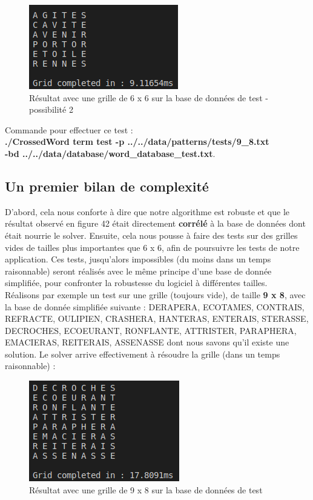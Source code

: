 \documentclass [ 11 pt ] {article}
\begin{document}
        \begin{figure}[H] 
            \center 
            \includegraphics[width=0.3\linewidth]{grid_2.png}
            \caption{Résultat avec une grille de 6 x 6 sur la base de données de test - possibilité 2}
        \end{figure}
        
        Commande pour effectuer ce test : \\
        \textbf{./CrossedWord term test -p ../../data/patterns/tests/9\_8.txt \\ -bd ../../data/database/word\_database\_test.txt}.
        
        \subsection{Un premier bilan de complexité}
        
        D'abord, cela nous conforte à dire que notre algorithme est robuste et que le résultat observé en figure 42 était directement \textbf{corrélé} à la base de données dont était nourrie le solver. Ensuite, cela nous pousse à faire des tests sur des grilles vides de tailles plus importantes que 6 x 6, afin de poursuivre les tests de notre application. Ces tests, jusqu'alors impossibles (du moins dans un temps raisonnable) seront réalisés avec le même principe d'une base de donnée simplifiée, pour confronter la robustesse du logiciel à différentes tailles. \\
        
        Réalisons par exemple un test sur une grille (toujours vide), de taille \textbf{9 x 8}, avec la base de donnée simplifiée suivante : {DERAPERA, ECOTAMES, CONTRAIS, REFRACTE, OULIPIEN, CRASHERA, HANTERAS, ENTERAIS, STERASSE, DECROCHES, ECOEURANT, RONFLANTE, ATTRISTER, PARAPHERA, EMACIERAS, REITERAIS, ASSENASSE} dont nous savons qu'il existe une solution. Le solver arrive effectivement à résoudre la grille (dans un temps raisonnable) : \\
        
        \begin{figure}[H] 
            \center 
            \includegraphics[width=0.3\linewidth]{grid_3.png}
            \caption{Résultat avec une grille de 9 x 8 sur la base de données de test}
        \end{figure}
        
\end{document}
